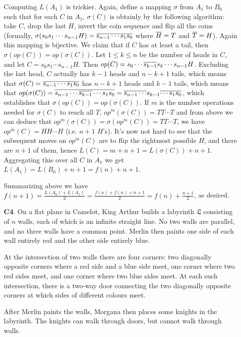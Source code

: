 \documentclass[11pt,a4paper]{article}
\begin{document}
\begin{enumerate}
	Computing $L(A_1)$ is trickier. Again, define a mapping $\sigma$ from $A_1$ to $B_0$ such that for each $C$ in $A_1$, $\sigma(C)$ is obtainly by the following algorithm: take $C$, drop the last $H$, invert the coin sequence and flip all the coins (formally, $\sigma(s_0s_1\cdots s_{n-1}H)=\overline{s_{n-1}\cdots s_1s_0}$ where $\overline{H}=T$ and $\overline{T}=H$). 
	Again this mapping is bijective. 
	We claim that if $C$ has at least a tail, then $\sigma(op(C))=op(\sigma(C))$. 
	Let $1\le k\le n$ be the number of heads in $C$, and let $C=s_0s_1\cdots s_{n-1}H$. 
	Then $op(C)=s_0\cdots \overline{s_{k-1}}s_k\cdots s_{n-1}H$. 
	Excluding the last head, $C$ actually has $k-1$ heads and $n-k+1$ tails, which means that $\sigma(C)=\overline{s_{n-1}\cdots s_1s_0}$ has $n-k+1$ heads and $k-1$ tails, which means that $op(\sigma(C))=\overline{s_{n-1}\cdots\overline{s_{k-1}}\cdots s_1s_0}=\overline{s_{n-1}\cdots}s_{k-1}\overline{\cdots s_1s_0}$, which establishes that $\sigma(op(C))=op(\sigma(C))$. 
	If $m$ is the number operations needed for $\sigma(C)$ to reach all $T$, $op^{m}(\sigma(C))=TT\cdots T$ and from above we can deduce that $op^{m}(\sigma(C))=\sigma(op^{m}(C))=TT\cdots T$, we have $op^{m}(C)=HH\cdots H$ (i.e. $n+1$ $H$'s). 
	It's now not hard to see that the subsequent moves on $op^{m}(C)$ are to flip the rightmost possible $H$, and there are $n+1$ of them, hence $L(C)=m+n+1=L(\sigma(C))+n+1$. 
	Aggregating this over all $C$ in $A_1$ we get $L(A_1)=L(B_0)+n+1=f(n)+n+1$. 
	
	Summarizing above we have $f(n+1)=\frac{L(A_0)+L(A_1)}{2}=\frac{f(n)+f(n)+n+1}{2}=f(n)+\frac{n+1}{2}$, as desired. 
	
	\item [\textbf{C4}.] On a flat plane in Camelot, King Arthur builds a labyrinth $\mathfrak{L}$ consisting of $n$ walls, each of which is an infinite straight line. No two walls are parallel, and no three walls have a common point. Merlin then paints one side of each wall entirely red and the other side entirely blue.
	
	At the intersection of two walls there are four corners: two diagonally opposite corners where a red side and a blue side meet, one corner where two red sides meet, and one corner where two blue sides meet. At each such intersection, there is a two-way door connecting the two diagonally opposite corners at which sides of different colours meet.
	
	After Merlin paints the walls, Morgana then places some knights in the labyrinth. The knights can walk through doors, but cannot walk through walls.
	

\end{enumerate}
\end{document}
